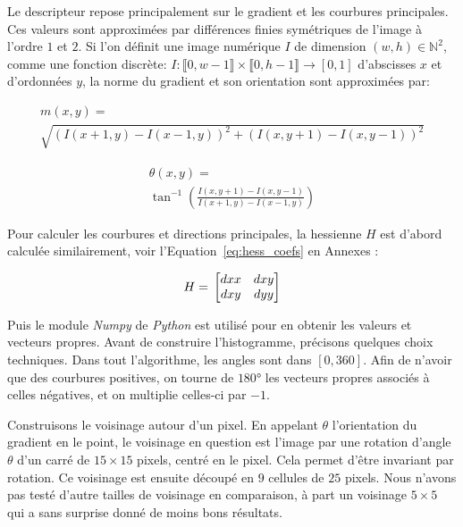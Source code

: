 \documentclass[
	a4paper, %
	10pt, %
	unnumberedsections, %
	twoside, %
]{LTJournalArticle}
\begin{document}
Le descripteur repose principalement sur le gradient et les courbures principales.
Ces valeurs sont approximées par différences finies symétriques de l'image à l'ordre $1$ et $2$.
Si l'on définit une image numérique $I$ de dimension $(w, h) \in \mathbb{N}^2$,
comme une fonction discrète:
$I: \llbracket 0, w-1 \rrbracket \times \llbracket 0, h-1 \rrbracket \rightarrow [0, 1]$
d'abscisses $x$ et d'ordonnées $y$, la norme du gradient
et son orientation sont approximées par:

\begin{multline}
	m(x, y) = \\
	\sqrt{(I(x+1, y) - I(x-1,y))^2 + (I(x,y+1)-I(x,y-1))^2}
\end{multline}

\begin{multline}
	\theta(x, y) = \\
	\tan^{-1}\left(\frac{I(x,y+1)-I(x,y-1)}{I(x+1, y) - I(x-1,y)}\right)
\end{multline}

Pour calculer les courbures et directions principales, la hessienne $H$ est d'abord calculée
similairement, voir l'Equation~\ref{eq:hess_coefs} en Annexes :

\begin{equation}
	H = \\
	\begin{bmatrix}
		dxx & dxy \\
		dxy & dyy
	\end{bmatrix}
\end{equation}

Puis le module \textit{Numpy} de \textit{Python} est utilisé pour en obtenir les valeurs et vecteurs
propres.
Avant de construire l'histogramme, précisons quelques choix techniques.
Dans tout l'algorithme, les angles sont dans $[0, 360]$. Afin de n'avoir que des
courbures positives, on tourne de $180$° les vecteurs propres associés à celles
négatives, et on multiplie celles-ci par $-1$.

Construisons le voisinage autour d'un pixel. En appelant $\theta$
l'orientation du gradient en le point, le voisinage en question est l'image par
une rotation d'angle $\theta$ d'un carré de $15\times 15$ pixels,
centré en le pixel. Cela permet d'être invariant par rotation.
Ce voisinage est ensuite découpé en $9$ cellules de $25$ pixels.
Nous n'avons pas testé d'autre tailles de voisinage en comparaison, à
part un voisinage $5 \times 5$ qui a sans surprise donné de moins bons résultats.
\end{document}
